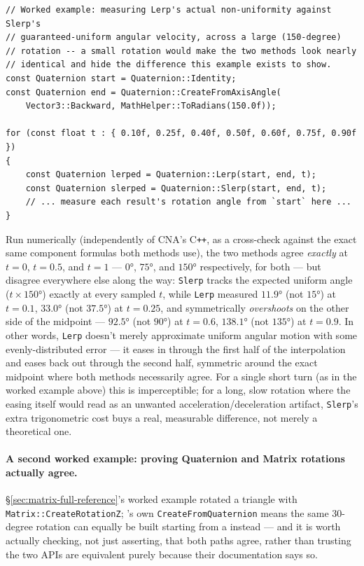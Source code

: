 \begin{lstlisting}
// Worked example: measuring Lerp's actual non-uniformity against Slerp's
// guaranteed-uniform angular velocity, across a large (150-degree)
// rotation -- a small rotation would make the two methods look nearly
// identical and hide the difference this example exists to show.
const Quaternion start = Quaternion::Identity;
const Quaternion end = Quaternion::CreateFromAxisAngle(
    Vector3::Backward, MathHelper::ToRadians(150.0f));

for (const float t : { 0.10f, 0.25f, 0.40f, 0.50f, 0.60f, 0.75f, 0.90f })
{
    const Quaternion lerped = Quaternion::Lerp(start, end, t);
    const Quaternion slerped = Quaternion::Slerp(start, end, t);
    // ... measure each result's rotation angle from `start` here ...
}
\end{lstlisting}

Run numerically (independently of CNA's C\texttt{++}, as a cross-check against the exact same
component formulas both methods use), the two methods agree \emph{exactly} at $t=0$, $t=0.5$,
and $t=1$ --- $0°$, $75°$, and $150°$ respectively, for both --- but disagree everywhere else
along the way: \texttt{Slerp} tracks the expected uniform angle ($t \times 150°$) exactly at
every sampled $t$, while \texttt{Lerp} measured $11.9°$ (not $15°$) at $t=0.1$, $33.0°$ (not
$37.5°$) at $t=0.25$, and symmetrically \emph{overshoots} on the other side of the midpoint ---
$92.5°$ (not $90°$) at $t=0.6$, $138.1°$ (not $135°$) at $t=0.9$. In other words, \texttt{Lerp}
doesn't merely approximate uniform angular motion with some evenly-distributed error --- it
eases in through the first half of the interpolation and eases back out through the second
half, symmetric around the exact midpoint where both methods necessarily agree. For a single
short turn (as in the worked example above) this is imperceptible; for a long, slow rotation
where the easing itself would read as an unwanted acceleration/deceleration artifact,
\texttt{Slerp}'s extra trigonometric cost buys a real, measurable difference, not merely a
theoretical one.

\paragraph{A second worked example: proving Quaternion and Matrix rotations actually agree.}
\S\ref{sec:matrix-full-reference}'s worked example rotated a triangle with
\texttt{Matrix::CreateRotationZ}; 's own \texttt{CreateFromQuaternion} means
the same 30-degree rotation can equally be built starting from a  instead
--- and it is worth actually checking, not just asserting, that both paths agree, rather than
trusting the two APIs are equivalent purely because their documentation says so.

